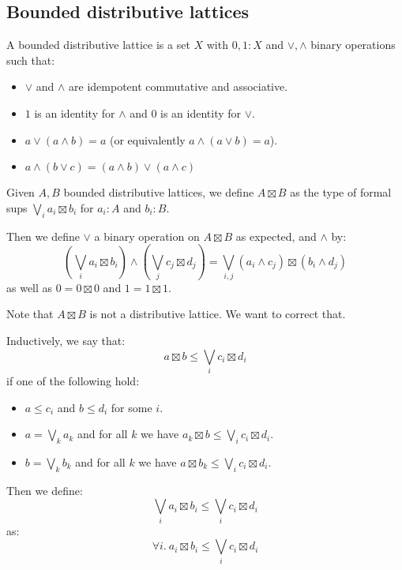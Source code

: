 

\subsection{Bounded distributive lattices}

\begin{definition}
A bounded distributive lattice is a set $X$ with $0,1:X$ and $\lor,\land$ binary operations such that:
\begin{itemize}
\item $\lor$ and $\land$ are idempotent commutative and associative.
\item $1$ is an identity for $\land$ and $0$ is an identity for $\lor$.
\item  $a\lor(a\land b) = a$ (or equivalently $a\land(a\lor b) = a$).
\item $a\land(b\lor c) = (a\land b)\lor(a\land c)$
\end{itemize}
\end{definition}

\begin{definition}
Given $A,B$ bounded distributive lattices, we define $A\boxtimes B$ as the type of formal sups $\bigvee_i a_i\boxtimes b_i$ for $a_i:A$ and $b_i:B$.

Then we define $\lor$ a binary operation on $A\boxtimes B$ as expected, and $\land$ by:
\[(\bigvee_ia_i\boxtimes b_i)\land (\bigvee_jc_j\boxtimes d_j) = \bigvee_{i,j}(a_i\land c_j)\boxtimes (b_i\land d_j)\]
as well as $0=0\boxtimes 0$ and $1=1\boxtimes 1$. 
\end{definition}

Note that $A\boxtimes B$ is not a distributive lattice. We want to correct that.

\begin{definition}
Inductively, we say that:
\[a\boxtimes b \leq \bigvee_ic_i\boxtimes d_i\]
if one of the following hold:
\begin{itemize}
\item $a\leq c_i$ and $b\leq d_i$ for some $i$.
\item $a=\bigvee_k a_k$ and for all $k$ we have $a_k\boxtimes b\leq \bigvee_ic_i\boxtimes d_i$.
\item $b=\bigvee_k b_k$ and for all $k$ we have $a\boxtimes b_k\leq \bigvee_ic_i\boxtimes d_i$.
\end{itemize}
Then we define:
\[\bigvee_ia_i\boxtimes b_i \leq \bigvee_ic_i\boxtimes d_i\]
as:
\[\forall i.\ a_i\boxtimes b_i \leq \bigvee_ic_i\boxtimes d_i\]
\end{definition}

